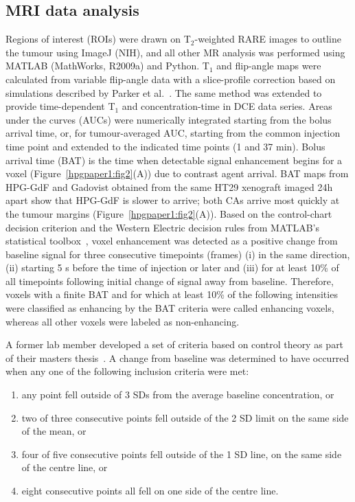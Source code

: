 \subsection{MRI data analysis}
\label{hpg_paper1_mrianalysis}
Regions of interest (ROIs) were drawn on T$_2$-weighted \acs{RARE} images to outline the tumour using ImageJ (NIH), and all other MR analysis was performed using MATLAB (MathWorks, R2009a) and Python.
T$_1$ and flip-angle maps were calculated from variable flip-angle data with a slice-profile correction based on simulations described by Parker et al.~\cite{Parker:2001wj}.
The same method was extended to provide time-dependent T$_1$ and concentration-time in DCE data series.
Areas under the curves (AUCs) were numerically integrated starting from the bolus arrival time, or, for tumour-averaged AUC, starting from the common injection time point and extended to the indicated time points (1 and 37 min).
Bolus arrival time (BAT) is the time when detectable signal enhancement begins for a voxel (Figure~\ref{hpgpaper1:fig2}(A)) due to contrast agent arrival.
\acs{BAT} maps from \acs{HPG-GdF} and Gadovist obtained from the same HT29 xenograft imaged 24h apart show that \acs{HPG-GdF} is slower to arrive; both \acs{CA}s arrive most quickly at the tumour margins (Figure~\ref{hpgpaper1:fig2}(A)). 
Based on the control-chart decision criterion and the Western Electric decision rules from MATLAB’s statistical toolbox~\cite{Shewhart:1931tq}, voxel enhancement was detected as a positive change from baseline signal for three consecutive timepoints (frames) (i) in the same direction, (ii) starting 5 s before the time of injection or later and (iii) for at least 10\% of all timepoints following initial change of signal away from baseline.
Therefore, voxels with a finite \acs{BAT} and for which at least 10\% of the following intensities were classified as enhancing by the \acs{BAT} criteria were called enhancing voxels, whereas all other voxels were labeled as non-enhancing.

A former lab member developed a set of criteria based on control theory as part of their masters thesis~\cite{McPhee:2012eu}.
A change from baseline was determined to have occurred when any one of the following inclusion criteria were met:

\begin{enumerate}
	\item any point fell outside of 3 SDs from the average baseline concentration, or
	\item two of three consecutive points fell outside of the 2 SD limit on the same side of the mean, or
	\item four of five consecutive points fell outside of the 1 SD line, on the same side of the centre line, or
	\item eight consecutive points all fell on one side of the centre line.
\end{enumerate}

